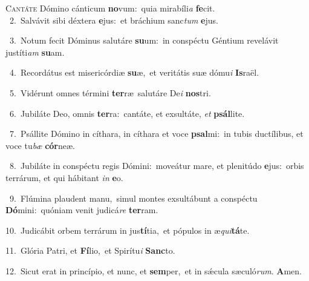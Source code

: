 \lettrine{\initial\textcolor{\initialcolor}{C}}{antáte} Dómino cánticum \textbf{no}\-vum:~\star quia mirabíli\textit{a} \textbf{fe}\-cit.\\
{\numbfont\textcolor{\numbcolor}{~2.}}~Salvávit sibi déxtera \textbf{e}\-jus:~\star et bráchium sanc\textit{tum} \textbf{e}\-jus.\par
{\numbfont\textcolor{\numbcolor}{~3.}}~Notum fecit Dóminus salutáre \textbf{su}\-um:~\star in conspéctu Géntium revelávit justíti\textit{am} \textbf{su}\-am.\par
{\numbfont\textcolor{\numbcolor}{~4.}}~Recordátus est misericórdiæ \textbf{su}\-æ,~\star et veritátis suæ dómu\textit{i} \textbf{Is}\-raël.\par
{\numbfont\textcolor{\numbcolor}{~5.}}~Vidérunt omnes términi \textbf{ter}\-ræ~\star salutáre De\textit{i} \textbf{nos}\-tri.\par
{\numbfont\textcolor{\numbcolor}{~6.}}~Jubiláte Deo, omnis \textbf{ter}\-ra:~\star cantáte, et exsultáte, \textit{et} \textbf{psál}\-lite.\par
{\numbfont\textcolor{\numbcolor}{~7.}}~Psállite Dómino in cíthara, in cíthara et voce \textbf{psal}\-mi:~\star in tubis ductílibus, et voce tu\textit{bæ} \textbf{cór}\-neæ.\par
{\numbfont\textcolor{\numbcolor}{~8.}}~Jubiláte in conspéctu regis Dómini:~\dagger moveátur mare, et plenitúdo \textbf{e}\-jus:~\star orbis terrárum, et qui hábitant \textit{in} \textbf{e}\-o.\par
{\numbfont\textcolor{\numbcolor}{~9.}}~Flúmina plaudent manu,~\dagger simul montes exsultábunt a conspéctu \textbf{Dó}\-mini:~\star quóniam venit judicá\textit{re} \textbf{ter}\-ram.\par
{\numbfont\textcolor{\numbcolor}{10.}}~Judicábit orbem terrárum in jus\-\textbf{tí}\-tia,~\star et pópulos in æ\-\textit{qui}\-\textbf{tá}te.\par
{\numbfont\textcolor{\numbcolor}{11.}}~Glória Patri, et \textbf{Fí}\-lio,~\star et Spirítu\textit{i} \textbf{Sanc}\-to.\par
{\numbfont\textcolor{\numbcolor}{12.}}~Sicut erat in princípio, et nunc, et \textbf{sem}\-per,~\star et in sǽcula sæculó\-\textit{rum}\-. \textbf{A}\-men.\par
